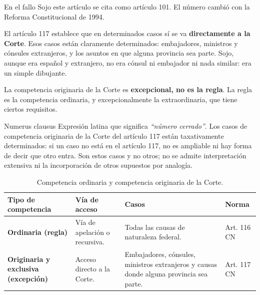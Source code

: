 \documentclass[12pt,oneside,a4paper]{book}
\begin{document}
\begin{note}
En el fallo Sojo este artículo se cita como artículo 101. El número cambió con la Reforma Constitucional de 1994.
\end{note}

El artículo 117 establece que en determinados casos sí se va \textbf{directamente a la Corte}. Esos casos están claramente determinados: embajadores, ministros y cónsules extranjeros, y los asuntos en que alguna provincia sea parte. %
Sojo, aunque era español y extranjero, no era cónsul ni embajador ni nada similar: era un simple dibujante.

\begin{important}
La competencia originaria de la Corte es \textbf{excepcional, no es la regla}. La regla es la competencia ordinaria, y excepcionalmente la extraordinaria, que tiene ciertos requisitos.
\end{important}

\begin{definition}{Numerus clausus}
Expresión latina que significa \textit{``número cerrado''}. Los casos de competencia originaria de la Corte del artículo 117 están taxativamente determinados: si un caso no está en el artículo 117, no es ampliable ni hay forma de decir que otro entra. Son estos casos y no otros; no se admite interpretación extensiva ni la incorporación de otros supuestos por analogía.
\end{definition}

\begin{table}[H]
\centering
\begin{tabularx}{\textwidth}{
    >{\raggedright\arraybackslash}p{}
    >{\raggedright\arraybackslash}p{}
    >{\raggedright\arraybackslash}X
    >{\raggedright\arraybackslash}p{}
}
\toprule
\textbf{Tipo de competencia} & \textbf{Vía de acceso} & \textbf{Casos} & \textbf{Norma} \\
\midrule
\textbf{Ordinaria (regla)} & Vía de apelación o recursiva. & Todas las causas de naturaleza federal. & Art. 116 CN \\
\addlinespace
\textbf{Originaria y exclusiva (excepción)} & Acceso directo a la Corte. & Embajadores, cónsules, ministros extranjeros y causas donde alguna provincia sea parte. & Art. 117 CN \\
\bottomrule
\end{tabularx}
\caption{Competencia ordinaria y competencia originaria de la Corte.}
\end{table}
\end{document}
